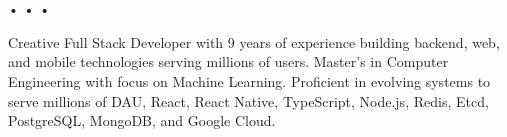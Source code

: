 \hspace*{1cm} \\ \vspace{5pt}
 \\ \vspace{5pt}
\href{tel:+1-872-258-5803}{\small{}}
\hspace{0.43em}•\hspace{0.43em}\href{mailto:an23lm+resumelead@gmail.com}{\small{}}
\hspace{0.43em}•\hspace{0.43em}\href{https://www.linkedin.com/in/anselmj}{\small{}}
\hspace{0.43em}•\hspace{0.43em}\href{https://an23lm.github.io}{\small{}} \\ \vspace{10pt}
{\small\setlength{\baselineskip}{14pt}Creative Full Stack Developer with 9 years of experience building backend, web, and mobile technologies serving millions of users. Master's in Computer Engineering with focus on Machine Learning. Proficient in evolving systems to serve millions of DAU, React, React Native, TypeScript, Node.js, Redis, Etcd, PostgreSQL, MongoDB, and Google Cloud.\par}
